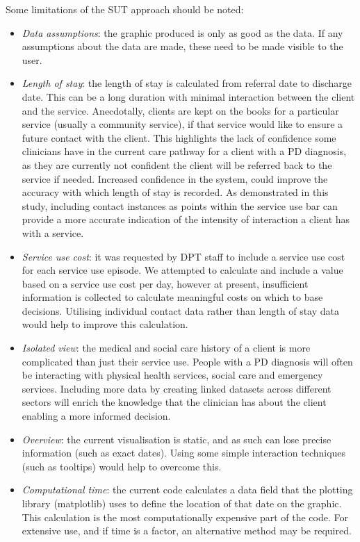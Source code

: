 \documentclass{article}
\begin{document}
Some limitations of the SUT approach should be noted:
\begin{itemize}
	\item \emph{Data assumptions}: the graphic produced is only as good as the data. If any assumptions about the data are made, these need to be made visible to the user.
	\item \emph{Length of stay}: the length of stay is calculated from referral date to discharge date. This can be a long duration with minimal interaction between the client and the service. Anecdotally, clients are kept on the books for a particular service (usually a community service), if that service would like to ensure a future contact with the client. This highlights the lack of confidence some clinicians have in the current care pathway for a client with a PD diagnosis, as they are currently not confident the client will be referred back to the service if needed. Increased confidence in the system, could improve the accuracy with which length of stay is recorded. As demonstrated in this study, including contact instances as points within the service use bar can provide a more accurate indication of the intensity of interaction a client has with a service.
	\item \emph{Service use cost}: it was requested by DPT staff to include a service use cost for each service use episode. We attempted to calculate and include a value based on a service use cost per day, however at present, insufficient information is collected to calculate meaningful costs on which to base decisions. Utilising individual contact data rather than length of stay data would help to improve this calculation.
	\item \emph{Isolated view}: the medical and social care history of a client is more complicated than just their service use. People with a PD diagnosis will often be interacting with physical health services, social care and emergency services.  Including more data by creating linked datasets across different sectors  will enrich the knowledge that the clinician has about the client enabling a more informed decision.
	\item \emph{Overview}: the current visualisation is static, and as such can lose precise information (such as exact dates). Using some simple interaction techniques (such as tooltips) would help to overcome this.
	\item \emph{Computational time}: the current code calculates a data field that the plotting library (matplotlib) uses to define the location of that date on the graphic. This calculation is the most computationally expensive part of the code. For extensive use, and if time is a factor, an alternative method may be required.
\end{itemize}
\end{document}
